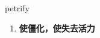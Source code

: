 
\begin{frame}
{\huge petrify}
\begin{center}
\begin{enumerate}\Large
  \item \textbf{使僵化，使失去活力}
\end{enumerate}
\end{center}
\end{frame}
